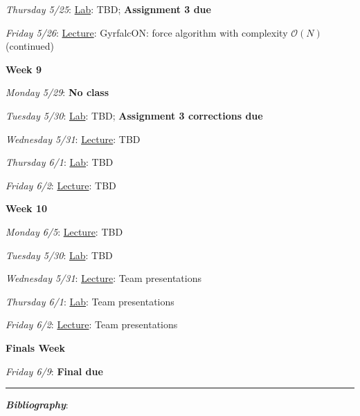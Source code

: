 \documentclass[12pt]{article}
\begin{document}
\emph{Thursday 5/25}: \underline{Lab}: TBD; \textbf{Assignment 3 due}

\emph{Friday 5/26}: \underline{Lecture}: GyrfalcON: force algorithm with complexity $\mathcal{O}(N)$ (continued)

\noindent\textbf{Week 9}

\emph{Monday 5/29}: \textbf{No class}

\emph{Tuesday 5/30}: \underline{Lab}: TBD; \textbf{Assignment 3 corrections due}

\emph{Wednesday 5/31}: \underline{Lecture}: TBD

\emph{Thursday 6/1}: \underline{Lab}: TBD

\emph{Friday 6/2}: \underline{Lecture}: TBD

\noindent\textbf{Week 10}

\emph{Monday 6/5}: \underline{Lecture}: TBD

\emph{Tuesday 5/30}: \underline{Lab}: TBD

\emph{Wednesday 5/31}: \underline{Lecture}: Team presentations

\emph{Thursday 6/1}: \underline{Lab}: Team presentations

\emph{Friday 6/2}: \underline{Lecture}: Team presentations

\noindent\textbf{Finals Week}

\emph{Friday 6/9}: \textbf{Final due}

\begin{center}
  \rule{\textwidth}{0.5pt}
\end{center}
\nocite{*}

\noindent\textbf{\emph{Bibliography}}:\\
\end{document}
